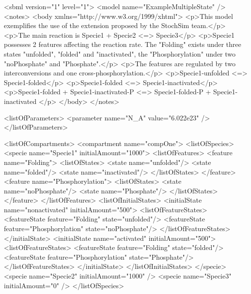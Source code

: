 \documentclass{cekarticle}
\newenvironment{changemargin}[2]{\begin{list}{}{%
\setlength{\leftmargin}{0pt}%
\setlength{\rightmargin}{0pt}%
\setlength{\listparindent}{\parindent}%
\setlength{\itemindent}{\parindent}%
\addtolength{\leftmargin}{#1}%
\addtolength{\rightmargin}{#2}%
}\item }{\end{list}}
\begin{document}
\begin{changemargin}{-2cm}{0cm}
\begin{example}
<sbml version="1" level="1">
    <model name="ExampleMultipleState" />
    <notes>
        <body xmlns="http://www.w3.org/1999/xhtml">
            <p>This model exemplifies the use of the extension proposed by the StochSim team.</p>
            <p>The main reaction is Specie1 + Specie2 <=> Specie3</p>
            <p>Specie1 possesses 2 features affecting the reaction rate. 
               The "Folding" exists under three states "unfolded", "folded" and "inactivated", 
               the "Phosphorylation" under two "noPhosphate" and "Phosphate".</p>
            <p>The features are regulated by two interconversions and one cross-phosphorylation.</p>
            <p>Specie1-unfolded <=> Specie1-folded</p>
            <p>Specie1-folded <=> Specie1-inactivated</p>
            <p>Specie1-folded + Specie1-inactivated-P <=> Specie1-folded-P + Specie1-inactivated </p>
        </body>
    </notes>

    <listOfParameters>
        <parameter name="N_A" value="6.022e23" />
    </listOfParameters>

    <listOfCompartments>
        <compartment name="compOne">
            <listOfSpecies>
                <specie name="Specie1" initialAmount="1000">
                    <listOfFeatures>
                        <feature name="Folding">
                            <listOfStates>
                                <state name="unfolded"/>
                                <state name="folded"/>
                                <state name="inactivated"/>
                            </listOfStates>
                        </feature>
                        <feature name="Phosphorylation">
                            <listOfStates>
                                <state name="noPhosphate"/>
                                <state name="Phosphate"/>
                            </listOfStates>
                        </feature>
                    </listOfFeatures>   
                    <listOfInitialStates>
                        <initialState name="nonactivated" initialAmount="500">
                            <listOfFeatureStates>
                                <featureState feature="Folding" state="unfolded"/>
                                <featureState feature="Phosphorylation" state="noPhosphate"/>
                            </listOfFeatureStates>
                        </initialState>
                        <initialState name="activated" initialAmount="500">
                            <listOfFeatureStates>
                                <featureState feature="Folding" state="folded"/>
                                <featureState feature="Phosphorylation" state="Phosphate"/>
                            </listOfFeatureStates>
                        </initialState>
                    </listOfInitialStates>
                </specie>
                <specie name="Specie2" initialAmount="1000" />
                <specie name="Specie3" initialAmount="0" />
            </listOfSpecies>


\end{example}
\end{changemargin}
\end{document}
